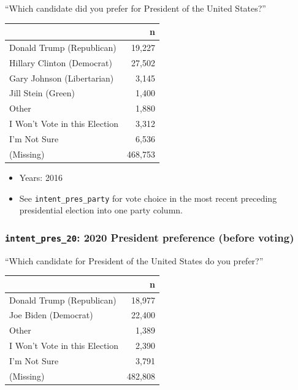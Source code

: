 \documentclass[10pt,article,oneside]{memoir}
\theoremstyle{definition}
\begin{document}
``Which candidate did you prefer for President of the United States?''

\begin{table}[H]
\centering
\begin{tabular}[t]{lr}
\toprule
 & n\\
\midrule
Donald Trump (Republican) & 19,227\\
Hillary Clinton (Democrat) & 27,502\\
Gary Johnson (Libertarian) & 3,145\\
Jill Stein (Green) & 1,400\\
Other & 1,880\\
I Won't Vote in this Election & 3,312\\
I'm Not Sure & 6,536\\
(Missing) & 468,753\\
\bottomrule
\end{tabular}
\end{table}

\begin{itemize}
\tightlist
\item
  Years: 2016
\item
  See \texttt{intent\_pres\_party} for vote choice in the most recent
  preceding presidential election into one party column.
\end{itemize}

\hypertarget{intent_pres_20-2020-president-preference-before-voting}{%
\subsubsection{\texorpdfstring{\texttt{intent\_pres\_20}: 2020 President
preference (before
voting)}{intent\_pres\_20: 2020 President preference (before voting)}}\label{intent_pres_20-2020-president-preference-before-voting}}

``Which candidate for President of the United States do you prefer?''

\begin{table}[H]
\centering
\begin{tabular}[t]{lr}
\toprule
 & n\\
\midrule
Donald Trump (Republican) & 18,977\\
Joe Biden (Democrat) & 22,400\\
Other & 1,389\\
I Won't Vote in this Election & 2,390\\
I'm Not Sure & 3,791\\
(Missing) & 482,808\\
\bottomrule
\end{tabular}
\end{table}
\end{document}
